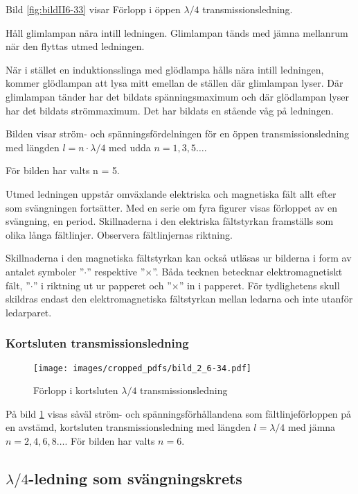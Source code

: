 Bild \ref{fig:bildII6-33} visar Förlopp i öppen $\lambda/4$
transmissionsledning.

Håll glimlampan nära intill ledningen.
Glimlampan tänds med jämna mellanrum när den flyttas utmed ledningen.

När i stället en induktionsslinga med glödlampa hålls nära intill ledningen,
kommer glödlampan att lysa mitt emellan de ställen där glimlampan lyser.
Där glimlampan tänder har det bildats spänningsmaximum och där glödlampan lyser
har det bildats strömmaximum.
Det har bildats en stående våg på ledningen.

Bilden visar ström- och spänningsfördelningen för en öppen transmissionsledning
med längden \(l = n\cdot\lambda/4\) med udda \(n = 1, 3, 5 \dots\).

För bilden har valts n = 5.

Utmed ledningen uppstår omväxlande elektriska och magnetiska fält allt
efter som svängningen fortsätter.
Med en serie om fyra figurer visas förloppet av en svängning, en period.
Skillnaderna i den elektriska fältstyrkan framställs som olika långa fältlinjer.
Observera fältlinjernas riktning.

Skillnaderna i den magnetiska fältstyrkan kan också utläsas ur
bilderna i form av antalet symboler ''\(\cdot\)'' respektive ''\(\times\)''.
Båda tecknen betecknar elektromagnetiskt fält, ''\(\cdot\)'' i riktning ut ur
papperet och ''\(\times\)'' in i papperet.
För tydlighetens skull skildras endast den elektromagnetiska fältstyrkan
mellan ledarna och inte utanför ledarparet.

\subsubsection{Kortsluten transmissionsledning}

\begin{figure}
  \texttt{[image: images/cropped\_pdfs/bild\_2\_6-34.pdf]}
  \caption{Förlopp i kortsluten $\lambda/4$ transmissionsledning}
  \label{fig:bildII6-34}
\end{figure}

På bild \ref{fig:bildII6-34} visas såväl ström- och spänningsförhållandena som
fältlinjeförloppen på en avstämd, kortsluten transmissionsledning med
längden \(l = \lambda/4\) med jämna \(n = 2, 4, 6, 8 \dots\).
För bilden har valts \(n = 6\).

\subsection{$\lambda/4$-ledning som svängningskrets}

